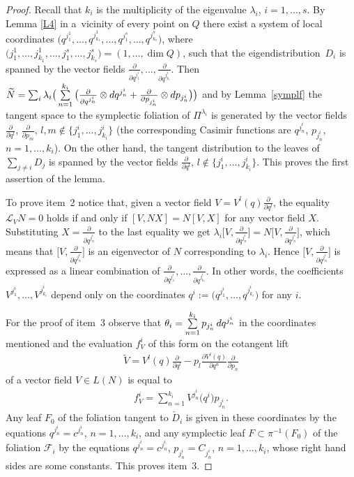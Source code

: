 \documentclass[11pt]{article}
\numberwithin{equation}{section}
\begin{document}
 \begin{proof} Recall that $k_i$ is the multiplicity of the eigenvalue $\lambda_i$, $i=1,\dots,s$. By Lemma \ref{L4} in a~vicinity of every point on $Q$ there exist a system of local coordinates $\big(q^{j^1_1},\dots,q^{j^1_{k_1}},\dots,q^{j^s_1},\dots,\allowbreak q^{j^s_{k_s}}\big)$, where $\big(j^1_1,\dots,j^1_{k_1},\dots,j^s_1,\dots,j^s_{k_s}\big)=(1,\dots,\dim Q)$, such that the eigendistribution~$D_i$ is spanned by the vector fields $\frac{\partial }{\partial q^{j^i_1}},\dots,\frac{\partial }{\partial q^{j^i_{k_i}}}$. Then $\widetilde{N}=\sum_i\lambda_i\big( \sum\limits_{n=1}^{k_i}\big(\frac{\partial}{\partial q^{j^i_n } }\otimes {\rm d}q^{j^i_n }+ \frac{\partial}{\partial p_{j^i_n } }\otimes {\rm d}p_{j^i_n}\big)\big)$ and by Lemma~\ref{symplf} the tangent space to the symplectic foliation of $\Pi^{\lambda_i}$ is generated by the vector fields $\frac{\partial }{\partial q^l}$, $\frac{\partial }{\partial p_m}$, $l,m\not\in\big\{j^i_1,\dots,j^i_{k_i}\big\}$ (the corresponding Casimir functions are $q^{j^i_n }$, $p_{j^i_n }$, $n=1,\dots,k_i$). On the other hand, the tangent distribution to the leaves of $\sum\limits_{j\not=i}D_j$ is spanned by the vector fields $\frac{\partial }{\partial q^l}$, $l\not\in\big\{j^i_1,\dots,j^i_{k_i}\big\}$. This proves the first assertion of the lemma.

To prove item~2 notice that, given a vector field $V=V^l(q)\frac{\partial }{\partial q^l}$, the equality $\mathcal{L}_VN=0$ holds if and only if $[V,NX]=N[V,X]$ for any vector field $X$. Substituting $X=\frac{\partial }{\partial q^{j^i_n}}$ to the last equality we get $\lambda_i\big[V,\frac{\partial }{\partial q^{j^i_n}}\big]=N\big[V,\frac{\partial }{\partial q^{j^i_n}}\big]$, which means that $\big[V,\frac{\partial }{\partial q^{j^i_n}}\big]$ is an eigenvector of $N$ corresponding to $\lambda_i$. Hence $\big[V,\frac{\partial }{\partial q^{j^i_n}}\big]$ is expressed as a linear combination of $\frac{\partial }{\partial q^{j^i_1}},\dots,\frac{\partial }{\partial q^{j^i_{k_i}}}$. In other words, the coefficients $V^{j^i_1},\dots,V^{j^i_{k_i}}$ depend only on the coordinates $q^i:=\big(q^{j^i_1},\dots,q^{j^i_{k_i}}\big)$ for any $i$.

For the proof of item~3 observe that $\theta_i=\sum\limits_{n=1}^{k_i}p_{j^i_n}\,{\rm d} q^{j^i_n}$ in the coordinates mentioned and the evaluation $f^i_V$ of this form on the cotangent lift
\begin{gather} \label{o}
 \widetilde{V}=V^l(q)\frac{\partial }{\partial q^l}-p_l\frac{\partial V^l(q)}{\partial q^n}\frac{\partial }{\partial p_n}
\end{gather}
of a vector field $V\in L(N)$ is equal to
\begin{gather*}
f^i_V=\sum_{n=1}^{k_i}V^{j^i_n}\big(q^i\big)p_{j^i_n}.
\end{gather*}
Any leaf $F_0$ of the foliation tangent to $\check D_i$ is given in these coordinates by the equations $q^{j^i_n}=c^{j^i_n}$, $n=1,\dots,k_i$, and any symplectic leaf $F \subset\pi^{-1}(F_0)$ of the foliation $\mathcal{F}_i$ by the equations $q^{j^i_n}=c^{j^i_n}$, $p_{j^i_n}=C_{j^i_n}$, $n=1,\dots,k_i$, whose right hand sides are some constants. This proves item~3.


\end{proof}
\end{document}

